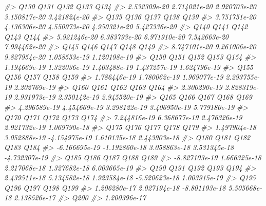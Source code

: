 \documentclass[]{article}
\newenvironment{Shaded}{\begin{snugshade}}{\end{snugshade}}
\newcommand{\CommentTok}[1]{\textcolor[rgb]{0.56,0.35,0.01}{\textit{#1}}}
\begin{document}
\begin{Shaded}
\begin{Highlighting}[]
\CommentTok{#>          Q130          Q131          Q132          Q133          Q134 }
\CommentTok{#>  2.532309e-20  2.714021e-20  2.920703e-20  3.150817e-20  3.421824e-20 }
\CommentTok{#>          Q135          Q136          Q137          Q138          Q139 }
\CommentTok{#>  3.751751e-20  4.136306e-20  4.550973e-20  4.950321e-20  5.427336e-20 }
\CommentTok{#>          Q140          Q141          Q142          Q143          Q144 }
\CommentTok{#>  5.921246e-20  6.383793e-20  6.971910e-20  7.542663e-20  7.994462e-20 }
\CommentTok{#>          Q145          Q146          Q147          Q148          Q149 }
\CommentTok{#>  8.747101e-20  9.261006e-20  9.827954e-20  1.058553e-19  1.120198e-19 }
\CommentTok{#>          Q150          Q151          Q152          Q153          Q154 }
\CommentTok{#>  1.194669e-19  1.322036e-19  1.403488e-19  1.437257e-19  1.624796e-19 }
\CommentTok{#>          Q155          Q156          Q157          Q158          Q159 }
\CommentTok{#>  1.786446e-19  1.780062e-19  1.969077e-19  2.293755e-19  2.202769e-19 }
\CommentTok{#>          Q160          Q161          Q162          Q163          Q164 }
\CommentTok{#>  2.300290e-19  2.828319e-19  2.931973e-19  2.350142e-19  2.945520e-19 }
\CommentTok{#>          Q165          Q166          Q167          Q168          Q169 }
\CommentTok{#>  4.296589e-19  4.454669e-19  3.298122e-19  3.406950e-19  5.779180e-19 }
\CommentTok{#>          Q170          Q171          Q172          Q173          Q174 }
\CommentTok{#>  7.244816e-19  6.368677e-19  2.476326e-19  2.921732e-19  1.069790e-18 }
\CommentTok{#>          Q175          Q176          Q177          Q178          Q179 }
\CommentTok{#>  1.497904e-18  3.052888e-19 -4.154975e-19  1.610135e-18  2.443903e-18 }
\CommentTok{#>          Q180          Q181          Q182          Q183          Q184 }
\CommentTok{#> -6.166695e-19 -1.192860e-18  3.058863e-18  3.531345e-18 -4.732307e-19 }
\CommentTok{#>          Q185          Q186          Q187          Q188          Q189 }
\CommentTok{#> -8.827103e-19  1.666325e-18  2.217068e-18  1.327682e-18  6.003665e-19 }
\CommentTok{#>          Q190          Q191          Q192          Q193          Q194 }
\CommentTok{#>  2.439511e-18  5.134582e-18  1.923584e-18 -5.520623e-18  1.003915e-19 }
\CommentTok{#>          Q195          Q196          Q197          Q198          Q199 }
\CommentTok{#>  1.206280e-17  2.027194e-18 -8.801193e-18  5.505668e-18  2.138526e-17 }
\CommentTok{#>          Q200 }
\CommentTok{#>  1.200396e-17}
\end{Highlighting}
\end{Shaded}
\end{document}
